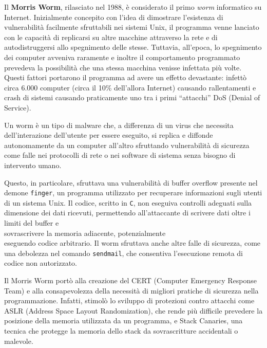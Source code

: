 Il \textbf{Morris Worm}, rilasciato nel 1988, è considerato il primo \textit{worm} informatico su Internet.
Inizialmente concepito con l'idea di dimostrare l'esistenza di vulnerabilità facilmente sfruttabili nei sistemi Unix, il programma venne lanciato con le capacità di replicarsi su altre macchine attraverso la rete e di autodistruggersi allo spegnimento delle stesse. Tuttavia, all'epoca, lo spegnimento dei computer avveniva raramente e inoltre il comportamento programmato prevedeva la possibilità che una stessa macchina venisse infettata più volte. Questi fattori portarono il programma ad avere un effetto devastante: infettò circa 6.000 computer (circa il 10\% dell'allora Internet) causando rallentamenti e crash di sistemi causando praticamente uno tra i primi ``attacchi'' DoS (Denial of Service).

Un worm è un tipo di malware che, a differenza di un virus che necessita dell'interazione dell'utente per essere eseguito, si replica e diffonde autonomamente da un computer all'altro sfruttando vulnerabilità di sicurezza come falle nei protocolli di rete o nei software di sistema senza bisogno di intervento umano.

Questo, in particolare, sfruttava una vulnerabilità di buffer overflow presente nel demone \texttt{finger}, un programma utilizzato per recuperare informazioni sugli utenti di un sistema Unix. Il codice, scritto in \texttt{C}, non eseguiva controlli adeguati sulla dimensione dei dati ricevuti, permettendo all'attaccante di scrivere dati oltre i limiti del buffer e \\sovrascrivere la memoria adiacente, potenzialmente \\eseguendo codice arbitrario. Il worm sfruttava anche altre falle di sicurezza, come una debolezza nel comando \texttt{sendmail}, che consentiva l'esecuzione remota di codice non autorizzato.

Il Morris Worm portò alla creazione del CERT (Computer Emergency Response Team) e alla consapevolezza della necessità di migliori pratiche di sicurezza nella programmazione. Infatti, stimolò lo sviluppo di protezioni contro attacchi come ASLR (Address Space Layout Randomization), che rende più difficile prevedere la posizione della memoria utilizzata da un programma, e Stack Canaries, una tecnica che protegge la memoria dello stack da sovrascritture accidentali o malevole.